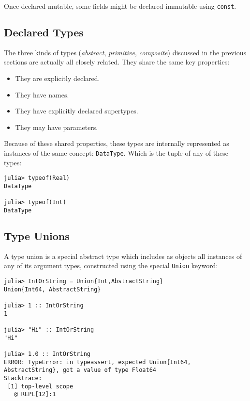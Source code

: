 \documentclass[
]{article}
\providecommand{\tightlist}{%
  \setlength{\itemsep}{0pt}\setlength{\parskip}{0pt}}
\begin{document}
Once declared mutable, some fields might be declared immutable using
\texttt{const}.

\hypertarget{declared-types}{%
\subsection{Declared Types}\label{declared-types}}

The three kinds of types (\emph{abstract}, \emph{primitive},
\emph{composite}) discussed in the previous sections are actually all
closely related. They share the same key properties:

\begin{itemize}
\tightlist
\item
  They are explicitly declared.
\item
  They have names.
\item
  They have explicitly declared supertypes.
\item
  They may have parameters.
\end{itemize}

Because of these shared properties, these types are internally
represented as instances of the same concept: \texttt{DataType}. Which
is the tuple of any of these types:

\begin{verbatim}
julia> typeof(Real)
DataType

julia> typeof(Int)
DataType
\end{verbatim}

\hypertarget{type-unions}{%
\subsection{Type Unions}\label{type-unions}}

A type union is a special abstract type which includes as objects all
instances of any of its argument types, constructed using the special
\texttt{Union} keyword:

\begin{verbatim}
julia> IntOrString = Union{Int,AbstractString}
Union{Int64, AbstractString}

julia> 1 :: IntOrString
1

julia> "Hi" :: IntOrString
"Hi"

julia> 1.0 :: IntOrString
ERROR: TypeError: in typeassert, expected Union{Int64, AbstractString}, got a value of type Float64
Stacktrace:
 [1] top-level scope
   @ REPL[12]:1
\end{verbatim}
\end{document}
